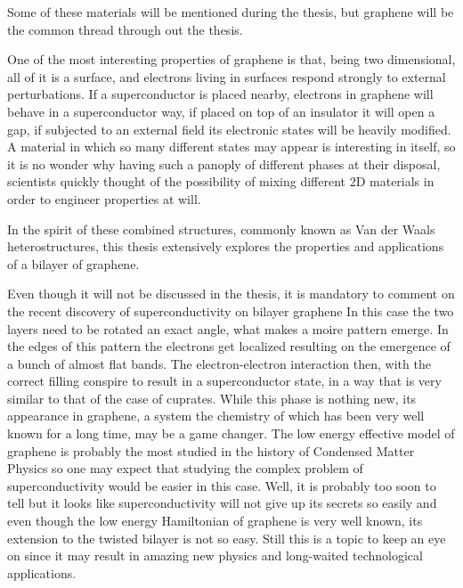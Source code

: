 Some of these materials will be mentioned during the thesis, but graphene will be the common thread through out the thesis.
\bigskip

One of the most interesting properties of graphene is that, being two dimensional, all of it is a surface, and electrons living in surfaces respond strongly to external perturbations.
If a superconductor is placed nearby, electrons in graphene will behave in a superconductor way\cite{},
if placed on top of an insulator it will open a gap\cite{}, if subjected to an external field its electronic states will be heavily modified.
A material in which so many different states may appear is interesting in itself, so it is no wonder why having such a panoply of different phases at their disposal, scientists quickly thought of the possibility of mixing different 2D materials in order to engineer properties at will\cite{Geim2013}.

In the spirit of these combined structures, commonly known as Van der Waals heterostructures, this thesis extensively explores the properties and applications of a bilayer of graphene.
\bigskip

Even though it will not be discussed in the thesis, it is mandatory to comment on the recent discovery of superconductivity on bilayer graphene\cite{}
In this case the two layers need to be rotated an exact angle, what makes a moire pattern emerge. In the edges of this pattern the electrons get localized resulting on the emergence of a bunch of almost flat bands. The electron-electron interaction then, with the correct filling conspire to result in a superconductor state, in a way that is very similar to that of the case of cuprates.
While this phase is nothing new, its appearance in graphene, a system the chemistry of which has been very well known for a long time, may be a game changer. The low energy effective model of graphene is probably the most studied in the history of Condensed Matter Physics so one may expect that studying the complex problem of superconductivity would be easier in this case.
Well, it is probably too soon to tell but it looks like superconductivity will not give up its secrets so easily and even though the low energy Hamiltonian of graphene is very well known, its extension to the twisted bilayer is not so easy. Still this is a topic to keep an eye on since it may result in amazing new physics and long-waited technological applications.
\bigskip

